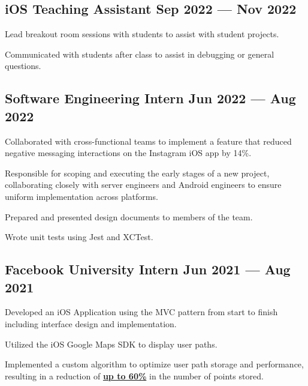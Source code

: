 
\subsection{{iOS Teaching Assistant \hfill Sep 2022 --- Nov 2022}}
\begin{zitemize}
\item Lead breakout room sessions with students to assist with student projects.
\item Communicated with students after class to assist in debugging or general questions.

\end{zitemize}


\subsection{{Software Engineering Intern \hfill Jun 2022 --- Aug 2022}}
\begin{zitemize}
\item Collaborated with cross-functional teams to implement a feature that reduced negative messaging interactions on the Instagram iOS app by 14\%.
\item Responsible for scoping and executing the early stages of a new project, collaborating closely with server engineers and Android engineers to ensure uniform implementation across platforms.
\item Prepared and presented design documents to members of the team.
\item Wrote unit tests using Jest and XCTest.
\end{zitemize}

\subsection{{Facebook University Intern \hfill Jun 2021 --- Aug 2021}}
\begin{zitemize}
\item Developed an iOS Application using the MVC pattern from start to finish including interface design and implementation.
\item Utilized the iOS Google Maps SDK to display user paths.
\item Implemented a custom algorithm to optimize user path storage and performance, resulting in a reduction of \href{https://docs.google.com/document/d/1MRAG9OrrXqONw2qEdH7BeSrUC1HFEtD6CoXgO1jC910/edit?usp=sharing}{\bf up to 60\%} in the number of points stored.
\end{zitemize}

